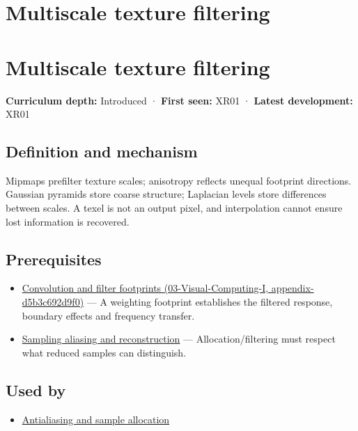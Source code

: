 \hypertarget{appendix-b677a85ba76f}{}
\section*{Multiscale texture filtering}
\section{Multiscale texture filtering}\label{multiscale-texture-filtering}

\textbf{Curriculum depth:} Introduced · \textbf{First seen:} XR01 · \textbf{Latest development:} XR01

\subsection{Definition and mechanism}\label{definition-and-mechanism}

Mipmaps prefilter texture scales; anisotropy reflects unequal footprint directions. Gaussian pyramids store coarse structure; Laplacian levels store differences between scales. A texel is not an output pixel, and interpolation cannot ensure lost information is recovered.

\subsection{Prerequisites}\label{prerequisites}

\begin{itemize}
\tightlist
\item
  \href{}{Convolution and filter footprints (03-Visual-Computing-I, appendix-d5b3c692d9f0)} --- A weighting footprint establishes the filtered response, boundary effects and frequency transfer.
\item
  \hyperref[appendix-6a7869dd79a6]{Sampling aliasing and reconstruction} --- Allocation/filtering must respect what reduced samples can distinguish.
\end{itemize}

\subsection{Used by}\label{used-by}

\begin{itemize}
\tightlist
\item
  \hyperref[appendix-4192b2bdd21e]{Antialiasing and sample allocation}
\end{itemize}

